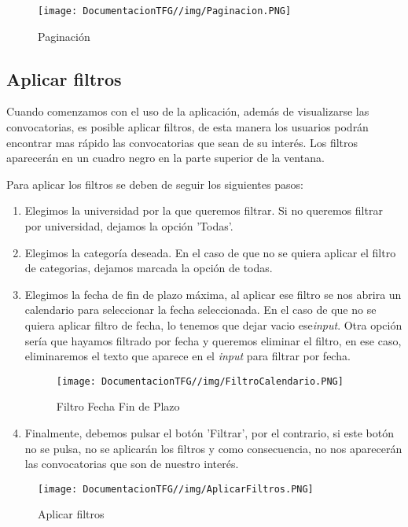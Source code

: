 \begin{figure}[H]
    \centering
    \texttt{[image: DocumentacionTFG//img/Paginacion.PNG]}
    \caption{Paginación}
    \label{fig:visualizacion-convocatorias}
\end{figure}

\subsection{Aplicar filtros}
Cuando comenzamos con el uso de la aplicación, además de visualizarse las convocatorias, es posible aplicar filtros, de esta manera los usuarios podrán encontrar mas rápido las convocatorias que sean de su interés. Los filtros aparecerán en un cuadro negro en la parte superior de la ventana.

Para aplicar los filtros se deben de seguir los siguientes pasos:
\begin{enumerate}
   \item Elegimos la universidad por la que queremos filtrar. Si no queremos filtrar por universidad, dejamos la opción 'Todas'. 
   \item Elegimos la categoría deseada. En el caso de que no se quiera aplicar el filtro de categorias, dejamos marcada la opción de todas.
   \item Elegimos la fecha de fin de plazo máxima, al aplicar ese filtro se nos abrira un calendario para seleccionar la fecha seleccionada. En el caso de que no se quiera aplicar filtro de fecha, lo tenemos que dejar vacio ese\textit{input}. Otra opción sería que hayamos filtrado por fecha y queremos eliminar el filtro, en ese caso, eliminaremos el texto que aparece en el \textit{input} para filtrar por fecha.
   \begin{figure}[H]
    \centering
    \texttt{[image: DocumentacionTFG//img/FiltroCalendario.PNG]}
    \caption{Filtro Fecha Fin de Plazo}
    \label{fig:filtro-calendario}
\end{figure}
   \item Finalmente, debemos pulsar el botón 'Filtrar', por el contrario, si este botón no se pulsa, no se aplicarán los filtros y como consecuencia, no nos aparecerán las convocatorias que son de nuestro interés.
\end{enumerate}

\begin{figure}[H]
    \centering
    \texttt{[image: DocumentacionTFG//img/AplicarFiltros.PNG]}
    \caption{Aplicar filtros}
    \label{fig:aplicar-filtros}
\end{figure}

